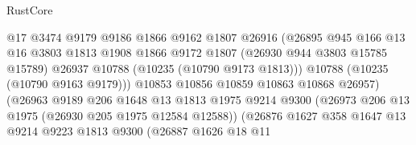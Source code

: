 \begin{lexlean}{RustCore}
\begin{coremodule}
                                        @17
                                        @3474
                                        @9179
                                        @9186
                                        @1866
                                        @9162
                                        @1807
                                        @26916
                                        (@26895
                                          @945
                                          @166
                                          @13
                                          @16
                                          @3803
                                          @1813
                                          @1908
                                          @1866
                                          @9172
                                          @1807
                                          (@26930 @944 @3803 @15785 @15789)
                                          @26937
                                          @10788
                                          (@10235 (@10790 @9173 @1813)))
                                        @10788
                                        (@10235 (@10790 @9163 @9179)))
                                      @10853
                                      @10856
                                      @10859
                                      @10863
                                      @10868
                                      @26957)
                                    (@26963
                                      @9189
                                      @206
                                      @1648
                                      @13
                                      @1813
                                      @1975
                                      @9214
                                      @9300
                                      (@26973 @206 @13 @1975 (@26930 @205 @1975 @12584 @12588))
                                      (@26876
                                        @1627
                                        @358
                                        @1647
                                        @13
                                        @9214
                                        @9223
                                        @1813
                                        @9300
                                        (@26887
                                          @1626
                                          @18
                                          @11

\end{coremodule}
\end{lexlean}
